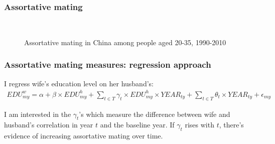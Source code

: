 \documentclass{beamer}
\begin{document}
\begin{frame}
	\frametitle{Assortative mating}\label{appendix:assortative_mating}
	\begin{figure}[]
		\centering
		\caption{Assortative mating in China among people aged 20-35, 1990-2010}\label{fig:assortative_mating}
		~
		~
	\end{figure}
	\hyperlink{appendix:reg_approach}{}
	\hyperlink{appendix:ct_approach}{}
\end{frame}

\begin{frame}[noframenumbering]
	\frametitle{Assortative mating measures: regression approach}\label{appendix:reg_approach}
	\footnotesize
	I regress wife's education level on her husband's:
	\begin{align*}
	EDU_{my}^w = \alpha + \beta\times EDU_{my}^h+\sum_{t\in T} \gamma_t\times EDU_{my}^h\times YEAR_{ty}+\sum_{t\in T}\theta_t\times YEAR_{ty}+\epsilon_{my}
	\end{align*}
	
	I am interested in the $\gamma_t$'s which measure the difference between wife and husband's correlation in year $t$ and the baseline year. If $\gamma_t$ rises with $t$, there's evidence of increasing assortative mating over time.
	
	\hyperlink{appendix:assortative_mating}{}	
\end{frame}
\end{document}
